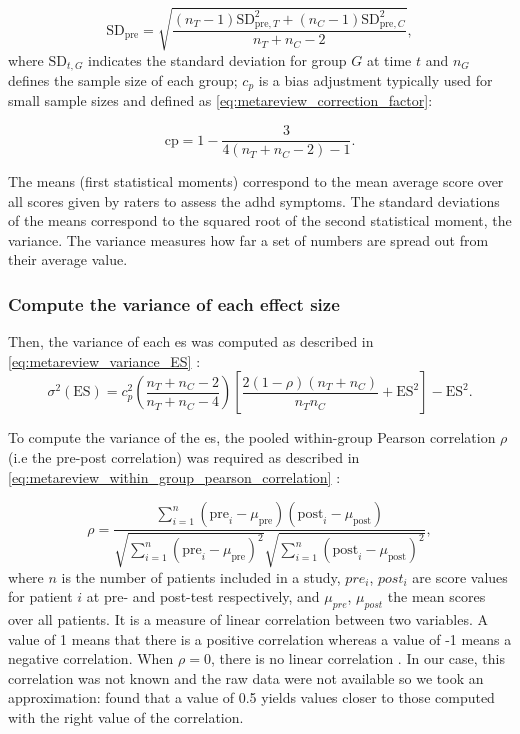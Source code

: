 \begin{equation}
\label{eq:stats_metareview_std_pre}
\text{SD}_{\text{pre}} = \sqrt{\frac{(n_T - 1)\text{SD}_{\text{pre},T}^2 + (n_C - 1)\text{SD}_{\text{pre},C}^2} {n_T + n_C - 2}},
\end{equation}
where $\text{SD}_{t,G}$ indicates the standard deviation for group $G$ at time $t$ and $n_G$ defines the sample size of each group; 
$c_p$ is a bias adjustment typically used for small sample sizes and defined as \cref{eq:metareview_correction_factor}:

\begin{equation}
\label{eq:metareview_correction_factor}
\text{cp} =  1 - \frac{3} {4(n_T + n_C - 2) - 1}. 
\end{equation} 

The means (first statistical moments) correspond to the mean average score over all scores given by raters to assess the \gls{adhd} symptoms. 
The standard deviations of the means correspond to the squared root of the second statistical moment, the variance. The variance measures how
 far a set of numbers are spread out from their average value. 

\subsubsection{Compute the variance of each effect size}

Then, the variance of each \gls{es} was computed as described in \cref{eq:metareview_variance_ES} \citep{Morris2008}:
\begin{equation}
\label{eq:metareview_variance_ES}
\sigma^2(\text{ES}) = c_p^2 \left (\frac{n_T + n_C - 2} {n_T + n_C - 4} \right ) \left  [ \frac{2(1-\rho)(n_T + n_C)} {n_Tn_C} + \text{ES}^2 \right ] - \text{ES}^2.
\end{equation} 

To compute the variance of the \gls{es}, the pooled within-group Pearson correlation $\rho$ (i.e the pre-post correlation) was required as described in \cref{eq:metareview_within_group_pearson_correlation} \citep{James2013}:

\begin{equation}
\label{eq:metareview_within_group_pearson_correlation}
\rho =  \frac{ \sum_{i=1}^{n} (\text{pre}_i - \mu_{\text{pre}})(\text{post}_i - \mu_{\text{post}}) } { \sqrt{ \sum_{i=1}^{n} (\text{pre}_i - \mu_{\text{pre}})^2} \sqrt{\sum_{i=1}^{n} (\text{post}_i - \mu_{\text{post}})^2} }, 
\end{equation}
where $n$ is the number of patients included in a study, $pre_i$, $post_i$ are score values for patient $i$ at pre- and post-test 
respectively, and $\mu_{pre}$, $\mu_{post}$ the mean scores over all patients. It is a measure of linear correlation between two variables. 
A value of 1 means that there is a positive correlation whereas a value of -1 means a negative correlation. When $\rho=0$, there is no
 linear correlation \citep{James2013}. In our case, this correlation was not known and the raw data were not available so we took an
 approximation: \citet{Balk2012} found that a value of 0.5 yields values closer to those computed with the right value of the correlation. 

